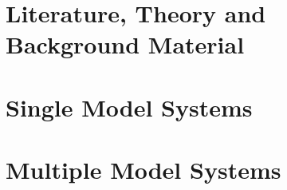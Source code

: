 \documentclass[11pt,fleqn]{report}
\theoremstyle{defstyle}
\begin{document}
\graphicspath{{./imgs/}{../imgs/}} %


\tableofcontents

\part{Literature, Theory and Background Material}
\label{part_one}




\part{Single Model Systems}
\label{part_two}

 

\part{Multiple Model Systems}
\label{part_three}






\newpage


\end{document}
